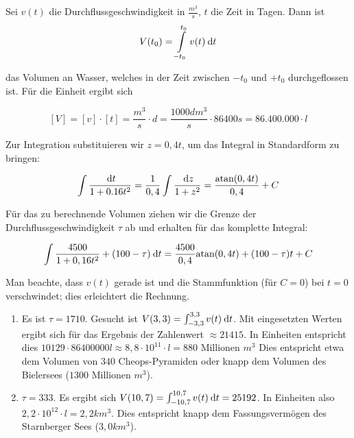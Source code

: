 Sei $v(t)$ die Durchflussgeschwindigkeit in $\frac{m^3}{s}$, $t$ die Zeit in Tagen. Dann ist
$$V(t_0) = \int\limits_{-t_0}^{t_0}v(t)\:\mathrm{d}{t}$$

das Volumen an Wasser, welches in der Zeit zwischen $-t_0$ und $+t_0$ durchgeflossen ist. Für die Einheit ergibt sich

$$[V] = [v]\cdot[t] = \frac{m^3}{s}\cdot d = \frac{1000 dm^3}{s}\cdot 86400s = 86.400.000\cdot l$$

Zur Integration substituieren wir $z=0,4t$, um das Integral in Standardform zu bringen:

$$\int \frac{\:\mathrm{d}{t}}{1+0.16t^2} = \frac{1}{0,4}\int\frac{\:\mathrm{d}{z}}{1+z^2} = \frac{\text{atan}(0,4t)}{0,4} + C$$

Für das zu berechnende Volumen ziehen wir die Grenze der Durchflussgeschwindigkeit $\tau$ ab und erhalten für das komplette Integral:

$$\int\frac{4500}{1+0,16t^2}+ (100-\tau) \:\mathrm{d}{t} = \frac{4500}{0,4} \text{atan}(0,4t) + (100-\tau)t + C$$

Man beachte, dass $v(t)$ gerade ist und die Stammfunktion (für $C=0$) bei $t=0$ verschwindet; dies erleichtert die Rechnung.

\begin{enumerate}[label=(\roman*)]

\item Es ist $\tau=1710$. Gesucht ist $V(3,3) = \int_{-3,3}^{3,3} v(t) \:\mathrm{d}{t}$. Mit eingesetzten Werten ergibt sich für das Ergebnis der Zahlenwert  $\approx 21415$. In Einheiten entspricht dies $10129\cdot 86400000l \approx 8,8 \cdot 10^{11} \cdot l = 880 \text{ Millionen } m^3$ Dies entspricht etwa dem Volumen von $340$ Cheops-Pyramiden oder knapp dem Volumen des Bielersees ($1300 \text{ Millionen } m^3$).

\item $\tau=333$. Es ergibt sich $V(10,7) = \int_{-10,7}^{10,7} v(t) \:\mathrm{d}{t} = 25192$. In Einheiten also $2,2\cdot10^{12}\cdot l = 2,2 km^3$. Dies entspricht knapp dem Fassungsvermögen des Starnberger Sees ($3,0 km^3$).

\end{enumerate}

